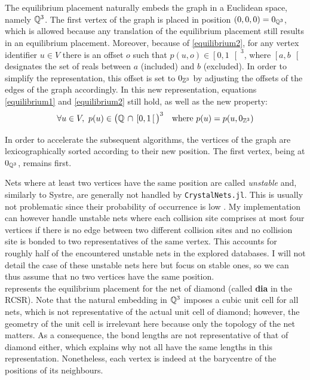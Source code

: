 \documentclass[main.tex]{subfiles}
\begin{document}
The equilibrium placement naturally embeds the graph in a Euclidean space, namely $\mathbb{Q}^3$. The first vertex of the graph is placed in position $(0,0,0) = 0_{\mathbb{Q}^3}$, which is allowed because any translation of the equilibrium placement still results in an equilibrium placement.
Moreover, because of \cref{equilibrium2}, for any vertex identifier $u\in V$ there is an offset $o$ such that $p(u,o)\in\left[0,1\,\right[^3$, where $\left[a,b\,\right[$ designates the set of reals between $a$ (included) and $b$ (excluded). In order to simplify the representation, this offset is set to $0_{\mathbb{Z}^3}$ by adjusting the offsets of the edges of the graph accordingly. In this new representation, equations \ref{equilibrium1} and \ref{equilibrium2} still hold, as well as the new property:
\[\forall u\in V,\ p(u)\in \big(\mathbb{Q}\,\cap\,\left[0,1\,\right[\big)^3\quad\text{where }p(u) = p(u,0_{\mathbb{Z}^3})\]

In order to accelerate the subsequent algorithms, the vertices of the graph are lexicographically sorted according to their new position. The first vertex, being at $0_{\mathbb{Q}^3}$, remains first.

Nets where at least two vertices have the same position are called \emph{unstable} and, similarly to Systre, are generally not handled by \texttt{CrystalNets.jl}. This is usually not problematic since their probability of occurrence is low \autocite{unstableNets}. My implementation can however handle unstable nets where each collision site comprises at most four vertices if there is no edge between two different collision sites and no collision site is bonded to two representatives of the same vertex. This accounts for roughly half of the encountered unstable nets in the explored databases. I will not detail the case of these unstable nets here but focus on stable ones, so we can thus assume that no two vertices have the same position.\\

 represents the equilibrium placement for the net of diamond (called {\bf dia} in the RCSR). Note that the natural embedding in $\mathbb{Q}^3$ imposes a cubic unit cell for all nets, which is not representative of the actual unit cell of diamond; however, the geometry of the unit cell is irrelevant here because only the topology of the net matters. As a consequence, the bond lengths are not representative of that of diamond either, which explains why not all have the same lengths in this representation. Nonetheless, each vertex is indeed at the barycentre of the positions of its neighbours.
\end{document}
